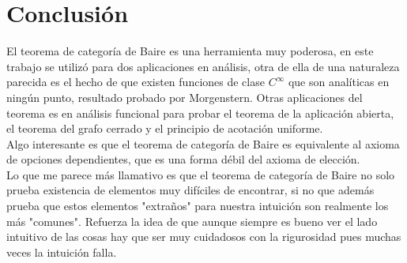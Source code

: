 \documentclass{article}
\theoremstyle{definition}
\begin{document}
\section{Conclusión}

El teorema de categoría de Baire es una herramienta muy poderosa, en este trabajo se utilizó para dos aplicaciones en análisis, otra de ella de una naturaleza parecida es el hecho de que existen funciones de clase $C^\infty$ que son analíticas en ningún punto, resultado probado por Morgenstern. Otras aplicaciones del teorema es en análisis funcional para probar el teorema de la aplicación abierta, el teorema del grafo cerrado y el principio de acotación uniforme. \\
Algo interesante es que el teorema de categoría de Baire es equivalente al axioma de opciones dependientes, que es una forma débil del axioma de elección.\\
Lo que me parece más llamativo es que el teorema de categoría de Baire no solo prueba existencia de elementos muy difíciles de encontrar, si no que además prueba que estos elementos "extraños" para nuestra intuición son realmente los más "comunes". Refuerza la idea de que aunque siempre es bueno ver el lado intuitivo de las cosas hay que ser muy cuidadosos con la rigurosidad pues muchas veces la intuición falla.  













\end{document}
